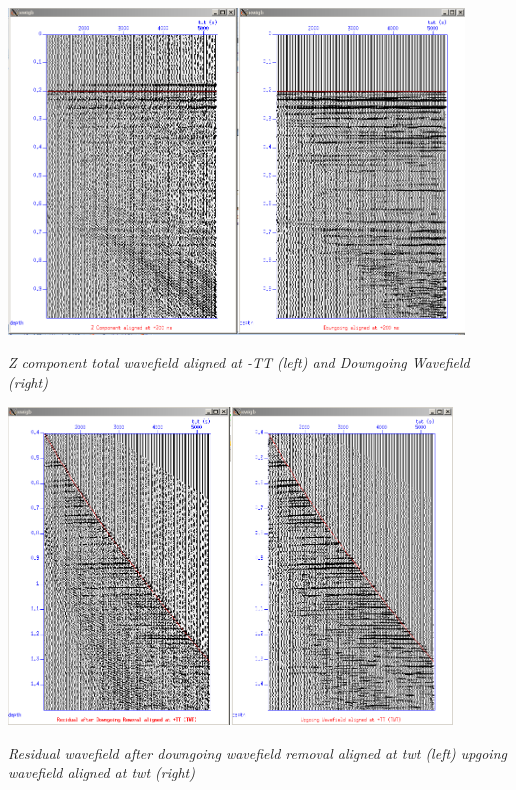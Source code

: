 \documentclass{article}
\begin{document}
\vspace{16pt}
\begin{center}
\includegraphics[width=343pt, height=245pt, keepaspectratio=true]{LatihanVSPsu-fig009.png}

\vspace{16pt}
\textit{Z component total wavefield aligned at -TT (left) and Downgoing Wavefield 
(right)}

\vspace{16pt}
\includegraphics[width=334pt, height=239pt, keepaspectratio=true]{LatihanVSPsu-fig010.png}

\vspace{16pt}
\textit{Residual wavefield after downgoing wavefield removal aligned at twt (left) 
upgoing wavefield aligned at twt (right)\pagebreak{}}
\end{center}
\end{document}
